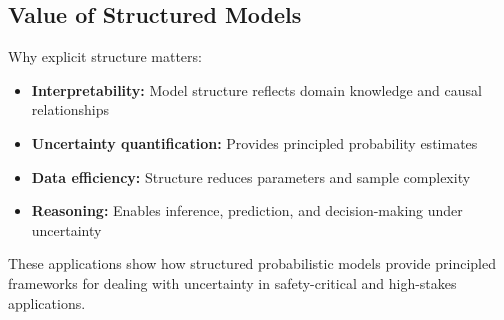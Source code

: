 \subsection{Value of Structured Models}

Why explicit structure matters:
\begin{itemize}
    \item \textbf{Interpretability:} Model structure reflects domain knowledge and causal relationships
    \item \textbf{Uncertainty quantification:} Provides principled probability estimates
    \item \textbf{Data efficiency:} Structure reduces parameters and sample complexity
    \item \textbf{Reasoning:} Enables inference, prediction, and decision-making under uncertainty
\end{itemize}

These applications show how structured probabilistic models provide principled frameworks for dealing with uncertainty in safety-critical and high-stakes applications.

